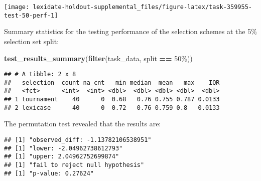\documentclass[
]{book}
\newenvironment{Shaded}{\begin{snugshade}}{\end{snugshade}}
\newcommand{\AttributeTok}[1]{\textcolor[rgb]{0.13,0.29,0.53}{#1}}
\newcommand{\DecValTok}[1]{\textcolor[rgb]{0.00,0.00,0.81}{#1}}
\newcommand{\FunctionTok}[1]{\textcolor[rgb]{0.13,0.29,0.53}{\textbf{#1}}}
\newcommand{\NormalTok}[1]{#1}
\newcommand{\OtherTok}[1]{\textcolor[rgb]{0.56,0.35,0.01}{#1}}
\newcommand{\SpecialCharTok}[1]{\textcolor[rgb]{0.81,0.36,0.00}{\textbf{#1}}}
\newcommand{\StringTok}[1]{\textcolor[rgb]{0.31,0.60,0.02}{#1}}
\begin{document}
\texttt{[image: lexidate-holdout-supplemental\_files/figure-latex/task-359955-test-50-perf-1]}

Summary statistics for the testing performance of the selection schemes at the 5\% selection set split:

\begin{Shaded}
\begin{Highlighting}[]
\FunctionTok{test\_results\_summary}\NormalTok{(}\FunctionTok{filter}\NormalTok{(task\_data, split }\SpecialCharTok{==} \StringTok{\textquotesingle{}50\%\textquotesingle{}}\NormalTok{))}
\end{Highlighting}
\end{Shaded}

\begin{verbatim}
## # A tibble: 2 x 8
##   selection  count na_cnt   min median  mean   max    IQR
##   <fct>      <int>  <int> <dbl>  <dbl> <dbl> <dbl>  <dbl>
## 1 tournament    40      0  0.68   0.76 0.755 0.787 0.0133
## 2 lexicase      40      0  0.72   0.76 0.759 0.8   0.0133
\end{verbatim}

The permutation test revealed that the results are:

\begin{Shaded}
\end{Shaded}

\begin{verbatim}
## [1] "observed_diff: -1.13782106538951"
## [1] "lower: -2.04962738612793"
## [1] "upper: 2.04962752699874"
## [1] "fail to reject null hypothesis"
## [1] "p-value: 0.27624"
\end{verbatim}
\end{document}
